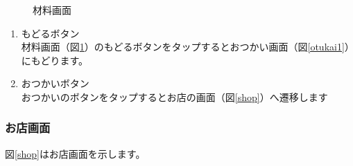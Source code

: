 \documentclass[a4j]{jarticle}
\begin{document}
\begin{figure}[H]
    \begin{center}
    \caption {材料画面}
    \label{material}
    \end{center}
\end{figure}

\begin{enumerate}
  \renewcommand{\labelenumi}{\textcircled{\scriptsize \theenumi}}
\item もどるボタン\\
  材料画面（図\ref{material}）のもどるボタンをタップするとおつかい画面（図\ref{otukai1}）にもどります。
\item おつかいボタン\\
 おつかいのボタンをタップするとお店の画面（図\ref{shop}）へ遷移します
\end{enumerate}

\newpage
\subsubsection{お店画面}
図\ref{shop}はお店画面を示します。\\
\end{document}
